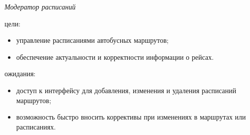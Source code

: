 \null

\noindent\textit{Модератор расписаний}

\noindent цели:
\begin{itemize}
    \item управление расписаниями автобусных маршрутов;
    \item обеспечение актуальности и корректности информации о рейсах.
\end{itemize}

\noindent ожидания:
\begin{itemize}
    \item доступ к интерфейсу для добавления, изменения и удаления
    расписаний маршрутов;
    \item возможность быстро вносить коррективы при изменениях в
    маршрутах или расписаниях.
\end{itemize}
